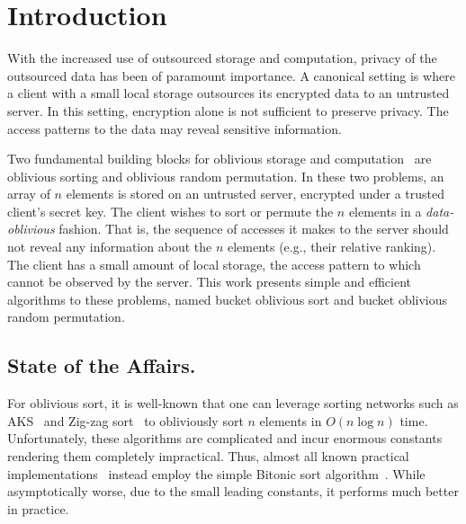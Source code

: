 


\section{Introduction}

With the increased use of outsourced storage and computation, privacy of the outsourced data has been of paramount importance. 
A canonical setting is where a client with a small local
storage outsources its encrypted data to an untrusted server. 
In this setting, encryption alone is not sufficient to preserve privacy.
The access patterns to the data may reveal sensitive information. 

Two fundamental building blocks for oblivious storage and computation~\cite{goldreich1996software,goodrich2011privacy,oblivistore} are oblivious sorting and oblivious random permutation.
In these two problems, an array of $n$ elements is stored on an untrusted server, encrypted under a trusted client's secret key.
The client wishes to sort or permute the $n$ elements in a \emph{data-oblivious} fashion.
That is, the sequence of accesses it makes to the server should not reveal any information about the $n$ elements (e.g., their relative ranking).
The client has a small amount of local storage, the access pattern to which cannot be observed by the server.
This work presents simple and efficient algorithms to these problems, named bucket oblivious sort and bucket oblivious random permutation.

\subsection{State of the Affairs.}
For oblivious sort, it is well-known that one can leverage 
sorting networks such as AKS~\cite{aks} and Zig-zag sort~\cite{zigzag}
to obliviously sort $n$ elements in $O(n\log n)$ time. 
Unfortunately, these algorithms are complicated and incur enormous constants rendering them completely impractical. 
Thus, almost all known practical implementations~\cite{oblivistore,oblivm,graphsc}
instead employ the simple Bitonic sort algorithm~\cite{bitonic}. 
While asymptotically worse, due to the small leading constants, it performs much better in practice.

